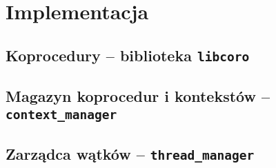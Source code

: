 \section{Implementacja}

\subsection{Koprocedury -- biblioteka {\bf {\tt libcoro}}}

\subsection{Magazyn koprocedur i kontekstów -- {\bf {\tt context\_manager}}}

\subsection{Zarządca wątków -- {\bf {\tt thread\_manager}}}

